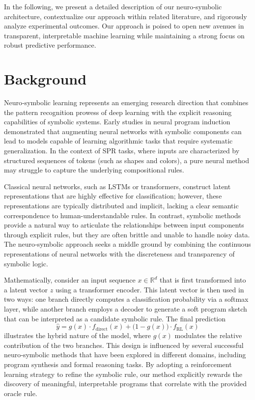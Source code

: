 \documentclass{article}
\begin{document}
In the following, we present a detailed description of our neuro‐symbolic architecture, contextualize our approach within related literature, and rigorously analyze experimental outcomes. Our approach is poised to open new avenues in transparent, interpretable machine learning while maintaining a strong focus on robust predictive performance.

\section{Background}
Neuro‐symbolic learning represents an emerging research direction that combines the pattern recognition prowess of deep learning with the explicit reasoning capabilities of symbolic systems. Early studies in neural program induction demonstrated that augmenting neural networks with symbolic components can lead to models capable of learning algorithmic tasks that require systematic generalization. In the context of SPR tasks, where inputs are characterized by structured sequences of tokens (such as shapes and colors), a pure neural method may struggle to capture the underlying compositional rules.

Classical neural networks, such as LSTMs or transformers, construct latent representations that are highly effective for classification; however, these representations are typically distributed and implicit, lacking a clear semantic correspondence to human-understandable rules. In contrast, symbolic methods provide a natural way to articulate the relationships between input components through explicit rules, but they are often brittle and unable to handle noisy data. The neuro‐symbolic approach seeks a middle ground by combining the continuous representations of neural networks with the discreteness and transparency of symbolic logic.

Mathematically, consider an input sequence \( x \in \mathbb{R}^d \) that is first transformed into a latent vector \( z \) using a transformer encoder. This latent vector is then used in two ways: one branch directly computes a classification probability via a softmax layer, while another branch employs a decoder to generate a soft program sketch that can be interpreted as a candidate symbolic rule. The final prediction
\[
\hat{y} = g(x) \cdot f_{\mathrm{direct}}(x) + \bigl(1-g(x)\bigr) \cdot f_{\mathrm{RL}}(x)
\]
illustrates the hybrid nature of the model, where \( g(x) \) modulates the relative contribution of the two branches. This design is influenced by several successful neuro‐symbolic methods that have been explored in different domains, including program synthesis and formal reasoning tasks. By adopting a reinforcement learning strategy to refine the symbolic rule, our method explicitly rewards the discovery of meaningful, interpretable programs that correlate with the provided oracle rule.
\end{document}
